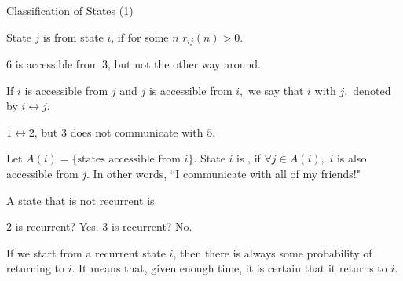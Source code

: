 \begin{frame}{Classification of States (1)}

{
\small
\plitemsep 0.05in
\bci
\item<2->  State $j$ is  from state $i$, if for some $n$ $r_{ij}(n) >0.$
\bci
\item<3-> 6 is accessible from 3, but not the other way around.  
\eci
\item<4->  If $i$ is accessible from $j$ and $j$ is accessible
  from $i,$ we say that $i$  with $j,$ denoted by
  $i \leftrightarrow j.$
\bci
\item<5-> $1 \leftrightarrow 2$, but $3$ does not communicate with $5.$
\eci
\eci
}
{
\vspace{-0.3cm}
\begin{center}
\end{center}
}

\small
\plitemsep 0.05in
\bci
 \item<6->  Let $A(i) = \{\text{states accessible from $i$} \}.$ State $i$ is , if 
 $\forall j \in A(i),$ $i$ is also accessible from $j.$  In other words, ``I communicate with all of my friends!"
\bci
  \item<7-> A state that is not recurrent is   
  \item<8-> 2 is recurrent? Yes. 3 is recurrent? No. 
 \item<9-> If we start from a recurrent state $i$, then there is always some probability of returning to $i.$ It means that, given enough time, it is certain that it returns to $i.$ 
\eci
\eci
\end{frame}

